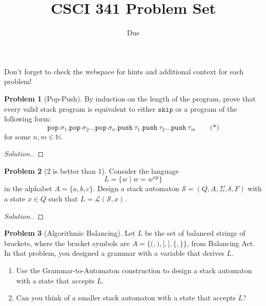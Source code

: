 \documentclass[11pt]{article}
\title{CSCI 341 Problem Set \pset}
\author{\subtitle}
\date{Due
    \duedate
}
\theoremstyle{theorem} %
\theoremstyle{definition} %
\newtheorem{problem}                    {{\color{BurntOrange}Problem}}
\theoremstyle{remark} %
\begin{document}
\maketitle

Don't forget to check the webspace for hints and additional context for each problem!

\begin{problem}
    [Pop-Push]
    By induction on the length of the program, prove that every valid stack program is equivalent to either \(\mathtt{skip}\) or a program of the following form:
    \[
        \mathtt{pop}~\sigma_1 {.}
        \mathtt{pop}~\sigma_2 \dots
        \mathtt{pop}~\sigma_n {.}
        \mathtt{push}~\tau_1 {.}
        \mathtt{push}~\tau_2 \dots
        \mathtt{push}~\tau_m
        \qquad \text{(*)}
    \]
    for some \(n,m \in \mathbb N\).
\end{problem}

\begin{proof}[Solution.]
    
\end{proof}

\begin{problem}
    [2 is better than 1]
    Consider the language 
    \[
        L = \{w \mid w = w^{\text{op}}\}
    \]
    in the alphabet \(A = \{a, b, c\}\).
    Design a stack automaton \(\mathcal S = (Q, A, \Sigma, \delta, F)\) with a state \(x\in Q\) such that \(L = \mathcal L(\mathcal S, x)\).
\end{problem}

\begin{proof}
    [Solution.]
\end{proof}

\begin{problem}
    [Algorithmic Balancing]
    Let \(L\) be the set of balanced strings of brackets, where the bracket symbols are \(A = \{\mathtt{(}, \mathtt{)}, \mathtt{[}, \mathtt{]}, \mathtt{\{}, \mathtt{\}}\}\), from Balancing Act.
    In that problem, you designed a grammar with a variable that derives \(L\).
    \begin{enumerate}
        \item
            Use the Grammar-to-Automaton construction to design a stack automaton with a state that accepts \(L\).
        \item
            Can you think of a smaller stack automaton with a state that accepts \(L\)?
    \end{enumerate}
\end{problem}
\end{document}
